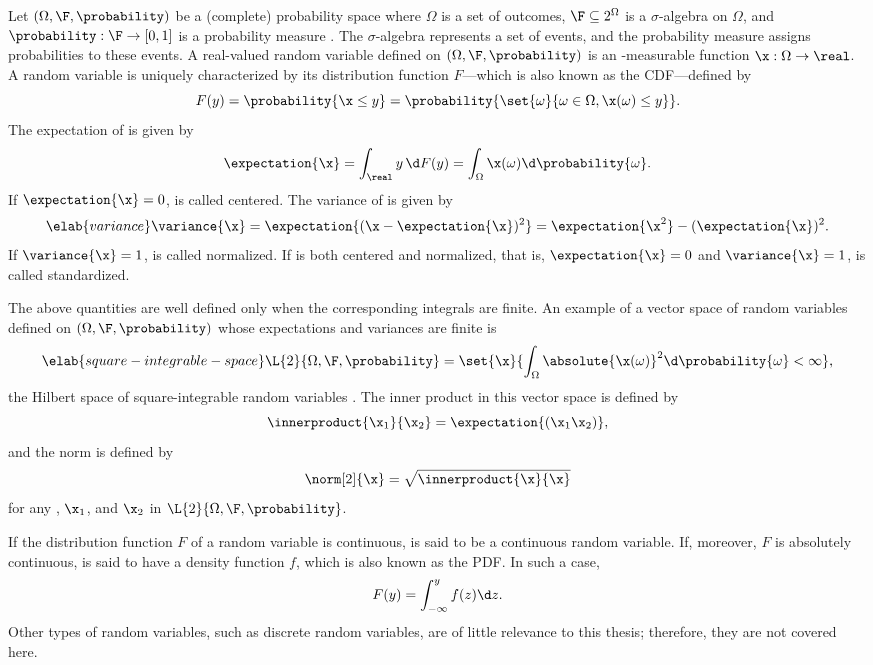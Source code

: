 Let $(\Omega, \F, \probability)$ be a (complete) probability space where
$\Omega$ is a set of outcomes, $\F \subseteq 2^\Omega$ is a $\sigma$-algebra on
$\Omega$, and $\probability: \F \to [0, 1]$ is a probability measure
\cite{durrett2010}. The $\sigma$-algebra represents a set of events, and the
probability measure assigns probabilities to these events. A real-valued random
variable defined on $(\Omega, \F, \probability)$ is an \F-measurable function
$\x: \Omega \to \real$. A random variable \x is uniquely characterized by its
distribution function $F$---which is also known as the \ac{CDF}---defined by
\begin{equation*}
  F(y) = \probability{\x \leq y} = \probability{\set{\omega}{\omega \in \Omega, \x(\omega) \leq y}}.
\end{equation*}
The expectation of \x is given by
\[
  \expectation{\x} = \int_\real y \, \d F(y) = \int_\Omega \x(\omega) \d \probability{\omega}.
\]
If $\expectation{\x} = 0$, \x is called centered. The variance of \x is given
by
\begin{equation} \elab{variance}
  \variance{\x}
  = \expectation{(\x - \expectation{\x})^2}
  = \expectation{\x^2} - (\expectation{\x})^2.
\end{equation}
If $\variance{\x} = 1$, \x is called normalized. If \x is both centered and
normalized, that is, $\expectation{\x} = 0$ and $\variance{\x} = 1$, \x is
called standardized.

The above quantities are well defined only when the corresponding integrals are
finite. An example of a vector space of random variables defined on $(\Omega,
\F, \probability)$ whose expectations and variances are finite is
\begin{equation} \elab{square-integrable-space}
  \L{2}{\Omega, \F, \probability} = \set{\x}{\int_\Omega \absolute{\x(\omega)}^2 \d \probability{\omega} < \infty},
\end{equation}
the Hilbert space of square-integrable random variables \cite{janson1997}. The
inner product in this vector space is defined by
\[
  \innerproduct{\x_1}{\x_2} = \expectation{(\x_1 \x_2)},
\]
and the norm is defined by
\[
  \norm[2]{\x} = \sqrt{\innerproduct{\x}{\x}}
\]
for any \x, $\x_1$, and $\x_2$ in $\L{2}{\Omega, \F, \probability}$.

If the distribution function $F$ of a random variable \x is continuous, \x is
said to be a continuous random variable. If, moreover, $F$ is absolutely
continuous, \x is said to have a density function $f$, which is also known as
the \ac{PDF}. In such a case,
\[
  F(y) = \int_{-\infty}^y f(z) \d z.
\]
Other types of random variables, such as discrete random variables, are of
little relevance to this thesis; therefore, they are not covered here.


